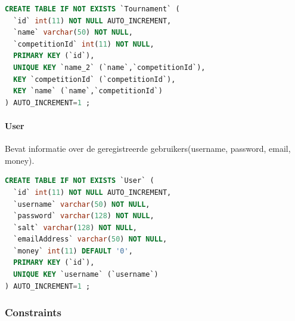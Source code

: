 \documentclass[11pt]{article}
\begin{document}
        \begin{framed}
        \begin{lstlisting}[language=sql]
CREATE TABLE IF NOT EXISTS `Tournament` (
  `id` int(11) NOT NULL AUTO_INCREMENT,
  `name` varchar(50) NOT NULL,
  `competitionId` int(11) NOT NULL,
  PRIMARY KEY (`id`),
  UNIQUE KEY `name_2` (`name`,`competitionId`),
  KEY `competitionId` (`competitionId`),
  KEY `name` (`name`,`competitionId`)
) AUTO_INCREMENT=1 ;
        \end{lstlisting}
        \end{framed}
        
        
        
        
    \paragraph{User}
        Bevat informatie over de geregistreerde gebruikers(username, password, email, money).
        
        \begin{framed}
        \begin{lstlisting}[language=sql]
CREATE TABLE IF NOT EXISTS `User` (
  `id` int(11) NOT NULL AUTO_INCREMENT,
  `username` varchar(50) NOT NULL,
  `password` varchar(128) NOT NULL,
  `salt` varchar(128) NOT NULL,
  `emailAddress` varchar(50) NOT NULL,
  `money` int(11) DEFAULT '0',
  PRIMARY KEY (`id`),
  UNIQUE KEY `username` (`username`)
) AUTO_INCREMENT=1 ;
        \end{lstlisting}
        \end{framed}




\subsubsection{Constraints}
\end{document}
